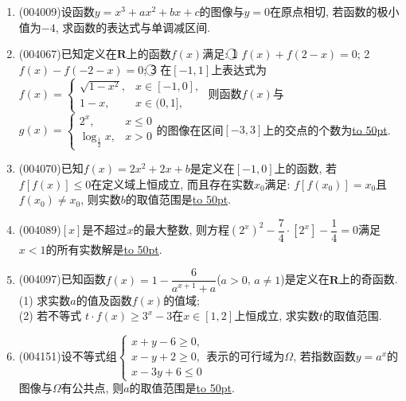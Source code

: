 \documentclass[10pt,a4paper]{article}
\newcommand{\blank}[1]{\underline{\hbox to #1pt{}}}
\begin{document}
\begin{enumerate}[1.]
\begin{center}
\end{center}
\item {\tiny (004009)}设函数$y=x^3+ax^2+bx+c$的图像与$y=0$在原点相切, 若函数的极小值为$-4$, 求函数的表达式与单调减区间.
\item {\tiny (004067)}已知定义在$\mathbf{R}$上的函数$f(x)$满足: \textcircled{1} $f(x)+f(2-x)=0$; \textcircled{2} $f(x)-f(-2-x)=0$; \textcircled{3} 在$[-1,1]$上表达式为$f(x)=\begin{cases} \sqrt{1-x^2}, & x\in [-1,0], \\ 1-x, & x\in (0,1], \end{cases}$ 则函数$f(x)$与$g(x)=\begin{cases} {2^x}, & x\le 0 \\ \log_\frac 12x, & x>0 \end{cases}$的图像在区间$[-3,3]$上的交点的个数为\blank{50}.
\item {\tiny (004070)}已知$f(x)=2x^2+2x+b$是定义在$[-1,0]$上的函数, 若$f[f(x)]\le 0$在定义域上恒成立, 而且存在实数$x_0$满足: $f[f(x_0)]=x_0$且$f(x_0)\ne x_0$, 则实数$b$的取值范围是\blank{50}.
\item {\tiny (004089)}$[x]$是不超过$x$的最大整数, 则方程$(2^x)^2-\dfrac 74\cdot [2^x]-\dfrac 14=0$满足$x<1$的所有实数解是\blank{50}.
\item {\tiny (004097)}已知函数$f(x)=1-\dfrac 6{a^{x+1}+a}$($a>0$, $a\ne 1$)是定义在$\mathbf{R}$上的奇函数.\\
(1) 求实数$a$的值及函数$f(x)$的值域;\\
(2) 若不等式 $t\cdot f(x)\ge 3^x-3$在$x\in [1,2]$上恒成立, 求实数$t$的取值范围.
\item {\tiny (004151)}设不等式组$\begin{cases} x+y-6\ge 0, \\ x-y+2\ge 0, \\ x-3y+6\le 0 \end{cases}$表示的可行域为$\Omega$, 若指数函数$y=a^x$的图像与$\Omega$有公共点, 则$a$的取值范围是\blank{50}.

\end{enumerate}
\end{document}

